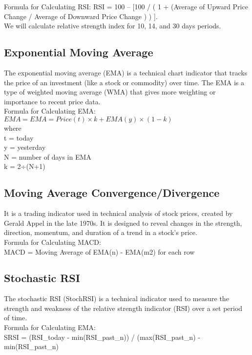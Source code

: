 \documentclass[conference]{IEEEtran}
\begin{document}
Formula for Calculating RSI: RSI = 100 – [100 / ( 1 + (Average of Upward Price Change / Average of Downward Price Change ) ) ].\\

We will calculate relative strength index for 10, 14, and 30 days periods.


\subsection{Exponential Moving Average}
The exponential moving average (EMA) is a technical chart indicator that tracks the price of an investment (like a stock or commodity) over time. The EMA is a type of weighted moving average (WMA) that gives more weighting or importance to recent price data.\\
Formula for Calculating EMA: \\
$EMA = EMA = Price(t)×k+EMA(y)×(1−k)$\\
where\\
t = today\\
y = yesterday\\
N = number of days in EMA\\
k = 2÷(N+1)

\subsection{Moving Average Convergence/Divergence}
It is a trading indicator used in technical analysis of stock prices, created by Gerald Appel in the late 1970s. It is designed to reveal changes in the strength, direction, momentum, and duration of a trend in a stock's price.\\

Formula for Calculating MACD:\\
 MACD = Moving Average of EMA(n) - EMA(m2) for each row
 
\subsection{Stochastic RSI}
 The stochastic RSI (StochRSI) is a technical indicator used to measure the strength and weakness of the relative strength indicator (RSI) over a set period of time.\\

Formula for Calculating EMA: \\
SRSI = (RSI_today - min(RSI_past_n)) / (max(RSI_past_n) - min(RSI_past_n)\\
\end{document}
